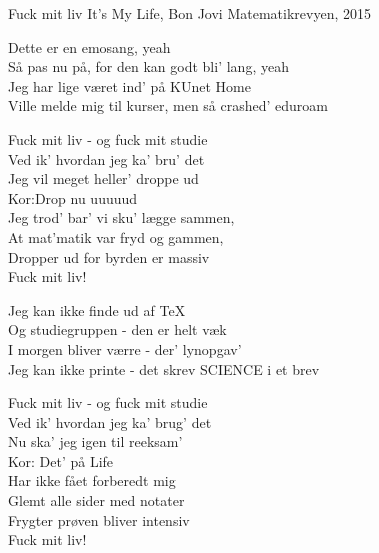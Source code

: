 \begin{song}{Fuck mit liv}
  {} %
  {It's My Life, Bon Jovi} %
  {} %
  {Matematikrevyen, 2015} %
  {\NotCCLIed} %

  \begin{SBVerse}
Dette er en emosang, yeah\\
Så pas nu på, for den kan godt bli' lang, yeah\\
Jeg har lige været ind' på KUnet Home\\
Ville melde mig til kurser, men så crashed' eduroam
  \end{SBVerse}

  \begin{SBChorus}
Fuck mit liv - og fuck mit studie\\
Ved ik' hvordan jeg ka' bru' det\\
Jeg vil meget heller' droppe ud\\
Kor:Drop nu uuuuud\\
Jeg trod' bar' vi sku' lægge sammen,\\
At mat'matik var fryd og gammen,\\
Dropper ud for byrden er massiv\\
Fuck mit liv!
  \end{SBChorus}

  \begin{SBVerse}
Jeg kan ikke finde ud af \TeX\\
Og studiegruppen - den er helt væk\\
I morgen bliver værre - der' lynopgav'\\
Jeg kan ikke printe - det skrev SCIENCE i et brev
  \end{SBVerse}

  \begin{SBChorus}
Fuck mit liv - og fuck mit studie\\
Ved ik' hvordan jeg ka' brug' det\\
Nu ska' jeg igen til reeksam'\\
Kor: Det' på Life\\
Har ikke fået forberedt mig\\
Glemt alle sider med notater\\
Frygter prøven bliver intensiv\\
Fuck mit liv!
  \end{SBChorus}


\end{song}
